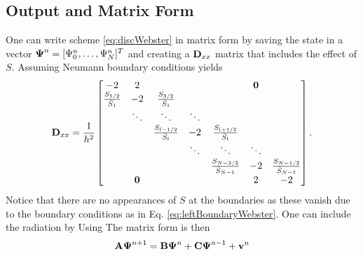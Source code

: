 
\subsection{Output and Matrix Form}\label{sec:outputWebster}
One can write scheme \eqref{eq:discWebster} in matrix form by saving the state in a vector $\boldsymbol{\Psi}^n = [\Psi_0^n, \hdots, \Psi_N^n]^T$ and creating a $\mathbf{D}_{xx}$ matrix that includes the effect of $S$. Assuming Neumann boundary conditions yields
\begin{equation}
    \mathbf{D}_{xx} = \frac{1}{h^2}\begin{bmatrix}
        -2& 2 &  & & & \mathbf{0}& \\
        \frac{S_{1/2}}{\bar{S}_1} & -2 &\frac{S_{3/2}}{\bar{S}_1} & & & & \\
        & \ddots & \ddots & \ddots &  & & \\
        & & \frac{S_{l-1/2}}{\bar{S}_l}& -2 & \frac{S_{l+1/2}}{\bar{S}_l} & & \\
        & & & \ddots & \ddots & \ddots & \\
        & & &  & \frac{S_{N-3/2}}{\bar{S}_{N-1}}  & -2 & \frac{S_{N-1/2}}{\bar{S}_{N-1}} \\
        & \mathbf{0} & & & & 2 & -2 \\
    \end{bmatrix}.
\end{equation}
Notice that there are no appearances of $S$ at the boundaries as these vanish due to the boundary conditions as in Eq. \eqref{eq:leftBoundaryWebster}.
One can include the radiation by 
Using
The matrix form is then
\begin{equation}\label{eq:matrixFormWebsters}
    \mathbf{A}\boldsymbol{\Psi}^{n+1} = \mathbf{B}\boldsymbol{\Psi}^n + \mathbf{C} \boldsymbol{\Psi}^{n-1} + \mathbf{v}^n
\end{equation}
